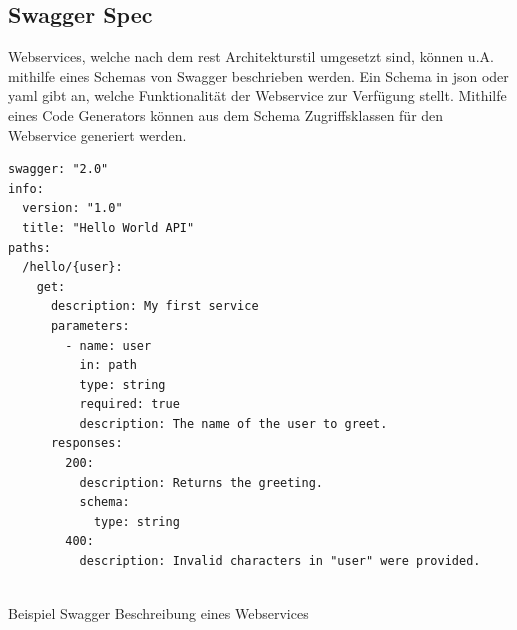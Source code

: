 \subsection{Swagger Spec}
Webservices, welche nach dem \gls{rest} Architekturstil umgesetzt sind, können u.A. mithilfe eines Schemas von Swagger \cite{swagger} beschrieben werden. Ein Schema in \gls{json} oder \gls{yaml} gibt an, welche Funktionalität der Webservice zur Verfügung stellt. Mithilfe eines Code Generators können aus dem Schema Zugriffsklassen für den Webservice generiert werden.

\begin{listing}[H]
\begin{verbatim}
swagger: "2.0"
info:
  version: "1.0"
  title: "Hello World API"
paths:
  /hello/{user}:
    get:
      description: My first service
      parameters:
        - name: user
          in: path
          type: string
          required: true
          description: The name of the user to greet.
      responses:
        200:
          description: Returns the greeting.
          schema:
            type: string
        400:
          description: Invalid characters in "user" were provided.
          
\end{verbatim}
\caption{Beispiel Swagger Beschreibung eines Webservices}
\end{listing}